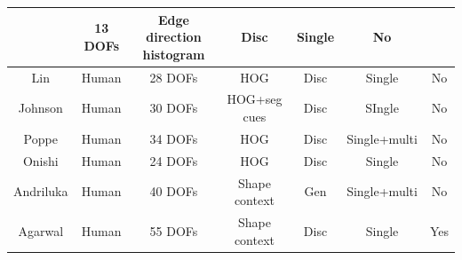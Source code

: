 \documentclass[a4paper,11pt]{kth-mag}
\begin{document}
\begin{table}[!ht]
{\begin{tabular}{|c|c|c|c|c|c|c|}
                                    & 13 DOFs 
                                    & Edge direction histogram %
                                    & Disc
                                    & Single
                                    & No
        \\
        \hline
        Lin \cite{humanBody} 
                                    & Human
                                    & 28 DOFs 
                                    & HOG
                                    & Disc 
                                    & Single
                                    & No
        \\
        \hline
        Johnson \cite{combining}     
                                    & Human
                                    & 30 DOFs
                                    & HOG+seg cues 
                                    & Disc 
                                    & SIngle
                                    & No
        \\
        \hline
        Poppe \cite{exampleBased}     
                                    & Human
                                    & 34 DOFs %
                                    & HOG %
                                    & Disc %
                                    & Single+multi
                                    & No
        \\
        \hline
        Onishi \cite{3Dhuman}     
                                    & Human
                                    & 24 DOFs 
                                    & HOG %
                                    & Disc%
                                    & Single 
                                    & No
        \\
        \hline
        Andriluka \cite{pictorial}     
                                    & Human
                                    & 40 DOFs 
                                    & Shape context 
                                    & Gen
                                    & Single+multi 
                                    & No
        \\
        \hline
        Agarwal \cite{recovering3D}     
                                    & Human
                                    & 55 DOFs 
                                    & Shape context 
                                    & Disc%
                                    & Single 
                                    & Yes

\end{tabular}}
\end{table}
\end{document}
